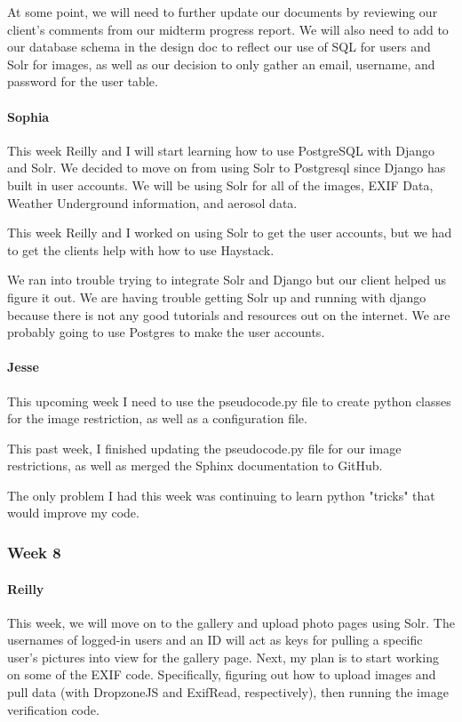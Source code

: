 \documentclass[onecolumn, draftclsnofoot,10pt, compsoc]{IEEEtran}
\begin{document}
\begin{flushleft}
At some point, we will need to further update our documents by reviewing our client's comments from our midterm progress report. We will also need to add to our database schema in the design doc to reflect our use of SQL for users and Solr for images, as well as our decision to only gather an email, username, and password for the user table.
 
\paragraph{Sophia}
 
This week Reilly and I will start learning how to use PostgreSQL with Django and Solr. We decided to move on from using Solr to Postgresql since Django has built in user accounts. We will be using Solr for all of the images, EXIF Data, Weather Underground information, and aerosol data.
 
 
This week Reilly and I worked on using Solr to get the user accounts, but we had to get the clients help with how to use Haystack.
 
 
We ran into trouble trying to integrate Solr and Django but our client helped us figure it out. We are having trouble getting Solr up and running with django because there is not any good tutorials and resources out on the internet. We are probably going to use Postgres to make the user accounts.
 
\paragraph{Jesse}
 
This upcoming week I need to use the pseudocode.py file to create python classes for the image restriction, as well as a configuration file.
 
 
This past week, I finished updating the pseudocode.py file for our image restrictions, as well as merged the Sphinx documentation to GitHub.
 
 
The only problem I had this week was continuing to learn python "tricks" that would improve my code.
 
\subsubsection{Week 8}
\paragraph{Reilly}
 
This week, we will move on to the gallery and upload photo pages using Solr. The usernames of logged-in users and an ID will act as keys for pulling a specific user's pictures into view for the gallery page. Next, my plan is to start working on some of the EXIF code. Specifically, figuring out how to upload images and pull data (with DropzoneJS and ExifRead, respectively), then running the image verification code.
 

\end{flushleft}
\end{document}
